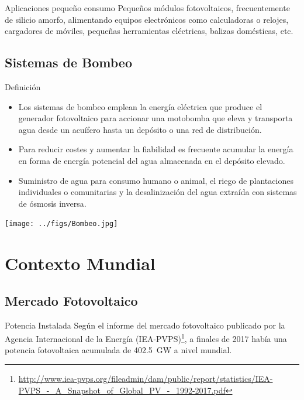 \documentclass[xcolor={usenames,svgnames,dvipsnames}]{beamer}
\begin{document}
\begin{frame}[label={sec:orgc8e9f56}]{Aplicaciones pequeño consumo}
Pequeños módulos fotovoltaicos, frecuentemente de silicio amorfo,
alimentando equipos electrónicos como calculadoras o relojes,
cargadores de móviles, pequeñas herramientas eléctricas, balizas
domésticas, etc.
\end{frame}


\subsection{Sistemas de Bombeo}
\label{sec:orgda612d4}
\begin{frame}[label={sec:org8ef1f44}]{Definición}
\begin{itemize}
\item Los sistemas de bombeo emplean la energía eléctrica que produce el
generador fotovoltaico para accionar una motobomba que eleva y
transporta agua desde un acuífero hasta un depósito o una red de
distribución.

\item Para reducir costes y aumentar la fiabilidad es frecuente acumular
la energía en forma de energía potencial del agua almacenada en el
depósito elevado.

\item Suministro de agua para consumo humano o animal, el riego de
plantaciones individuales o comunitarias y la desalinización del
agua extraída con sistemas de ósmosis inversa.
\end{itemize}
\end{frame}
\begin{frame}[label={sec:org6cc9422}]{}
\begin{center}
\texttt{[image: ../figs/Bombeo.jpg]}
\end{center}
\end{frame}

\section{Contexto Mundial}
\label{sec:org065d5a1}

\subsection{Mercado Fotovoltaico}
\label{sec:org6a36a94}

\begin{frame}[label={sec:org56cd2df}]{Potencia Instalada}
Según el informe del mercado fotovoltaico publicado por la Agencia
Internacional de la Energía (IEA-PVPS)\footnote{\url{http://www.iea-pvps.org/fileadmin/dam/public/report/statistics/IEA-PVPS\_-\_A\_Snapshot\_of\_Global\_PV\_-\_1992-2017.pdf}}, a finales de 2017 había una
potencia fotovoltaica acumulada de \SI{402.5}{\giga\watt} a nivel
mundial.
\end{frame}
\end{document}
